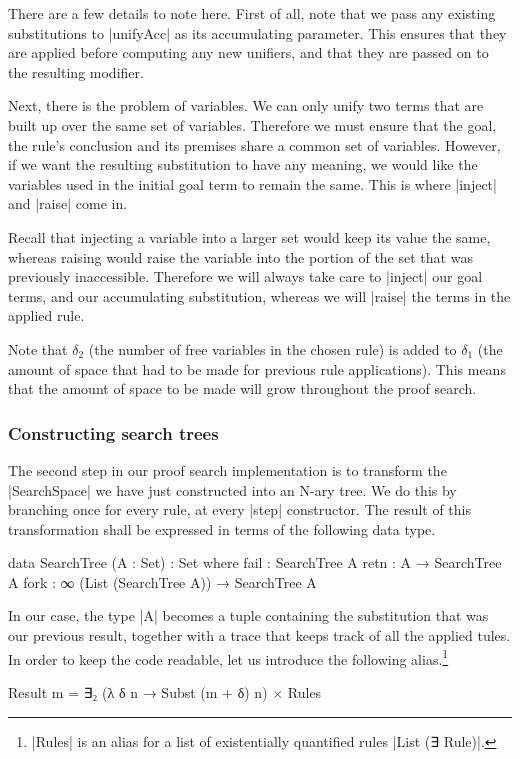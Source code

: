 \documentclass[preprint]{sigplanconf}
\begin{document}
There are a few details to note here.
First of all, note that we pass any existing substitutions to
|unifyAcc| as its accumulating parameter. This ensures that they are
applied before computing any new unifiers, and that they are passed on
to the resulting modifier.

Next, there is the problem of variables. We can only unify two terms
that are built up over the same set of variables. Therefore we must
ensure that the goal, the rule's conclusion and its premises share a
common set of variables.
However, if we want the resulting substitution to have any meaning, we
would like the variables used in the initial goal term to remain the
same. This is where |inject| and |raise| come in.

Recall that injecting a variable into a larger set would keep its
value the same, whereas raising would raise the variable into the
portion of the set that was previously inaccessible. Therefore we will
always take care to |inject| our goal terms, and our accumulating
substitution, whereas we will |raise| the terms in the applied
rule.

Note that $\delta_2$ (the number of free variables in the chosen rule)
is added to $\delta_1$ (the amount of space that had to be made for
previous rule applications). This means that the amount of space to be
made will grow throughout the proof search.



\subsubsection*{Constructing search trees}

The second step in our proof search implementation is to transform the
|SearchSpace| we have just constructed into an N-ary tree. We do this
by branching once for every rule, at every |step| constructor.
The result of this transformation shall be expressed in terms of the
following data type.
\begin{code}
data SearchTree (A : Set) : Set where
  fail  : SearchTree A
  retn  : A → SearchTree A
  fork  : ∞ (List (SearchTree A)) → SearchTree A
\end{code}
In our case, the type |A| becomes a tuple containing the substitution
that was our previous result, together with a trace that keeps track
of all the applied tules. In order to keep the code readable, let us
introduce the following alias.\footnote{
  |Rules| is an alias for a list of existentially quantified rules
  |List (∃ Rule)|.
}
\begin{code}
  Result m  = ∃₂ (λ δ n → Subst (m + δ) n) × Rules
\end{code}
\end{document}
